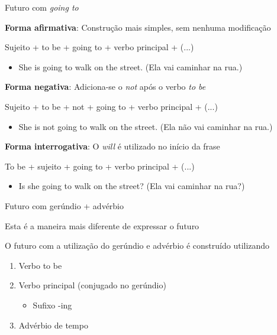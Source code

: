 \documentclass[compress,mathserif,xcolor=table]{beamer}
\begin{document}

\begin{frame}{Futuro com \textit{going to}}

\textbf{Forma afirmativa}: Construção mais simples, sem nenhuma modificação

Sujeito + to be + going to + verbo principal + (...)
\begin{itemize}
    \item She is going to walk on the street. (Ela vai caminhar na rua.)
\end{itemize}

\vspace{0.25cm}

\textbf{Forma negativa}: Adiciona-se o \textit{not} após o verbo \textit{to be}

Sujeito + to be + not + going to + verbo principal + (...)
\begin{itemize}
    \item She is not going to walk on the street. (Ela não vai caminhar na rua.)
\end{itemize}

\vspace{0.25cm}

\textbf{Forma interrogativa}: O \textit{will} é utilizado no início da frase

To be + sujeito + going to + verbo principal + (...)
\begin{itemize}
    \item Is she going to walk on the street? (Ela vai caminhar na rua?)
\end{itemize}

\end{frame}












\begin{frame}{Futuro com gerúndio + advérbio}

Esta é a maneira mais diferente de expressar o futuro

\vspace{0.5cm}

O futuro com a utilização do gerúndio e advérbio é construído utilizando
\begin{enumerate}
    \item Verbo to be
    \item Verbo principal (conjugado no gerúndio)
    \begin{itemize}
        \item Sufixo -ing
    \end{itemize}
    \item Advérbio de tempo
\end{enumerate}

\end{frame}
\end{document}

